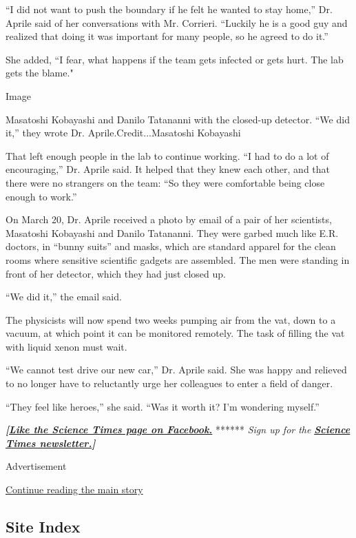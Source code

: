 ``I did not want to push the boundary if he felt he wanted to stay
home,'' Dr. Aprile said of her conversations with Mr. Corrieri.
``Luckily he is a good guy and realized that doing it was important for
many people, so he agreed to do it.''

She added, ``I fear, what happens if the team gets infected or gets
hurt. The lab gets the blame."

Image

Masatoshi Kobayashi and Danilo Tatananni with the closed-up detector.
``We did it,'' they wrote Dr. Aprile.Credit...Masatoshi Kobayashi

That left enough people in the lab to continue working. ``I had to do a
lot of encouraging,'' Dr. Aprile said. It helped that they knew each
other, and that there were no strangers on the team: ``So they were
comfortable being close enough to work.''

On March 20, Dr. Aprile received a photo by email of a pair of her
scientists, Masatoshi Kobayashi and Danilo Tatananni. They were garbed
much like E.R. doctors, in ``bunny suits'' and masks, which are standard
apparel for the clean rooms where sensitive scientific gadgets are
assembled. The men were standing in front of her detector, which they
had just closed up.

``We did it,'' the email said.

The physicists will now spend two weeks pumping air from the vat, down
to a vacuum, at which point it can be monitored remotely. The task of
filling the vat with liquid xenon must wait.

``We cannot test drive our new car,'' Dr. Aprile said. She was happy and
relieved to no longer have to reluctantly urge her colleagues to enter a
field of danger.

``They feel like heroes,'' she said. ``Was it worth it? I'm wondering
myself.''

\textbf{\emph{{[}}\href{http://on.fb.me/1paTQ1h}{\emph{Like the Science
Times page on Facebook.}}} ****** \emph{\textbar{} Sign up for the}
\textbf{\href{http://nyti.ms/1MbHaRU}{\emph{Science Times
newsletter.}}\emph{{]}}}

Advertisement

\protect\hyperlink{after-bottom}{Continue reading the main story}

\hypertarget{site-index}{%
\subsection{Site Index}\label{site-index}}

